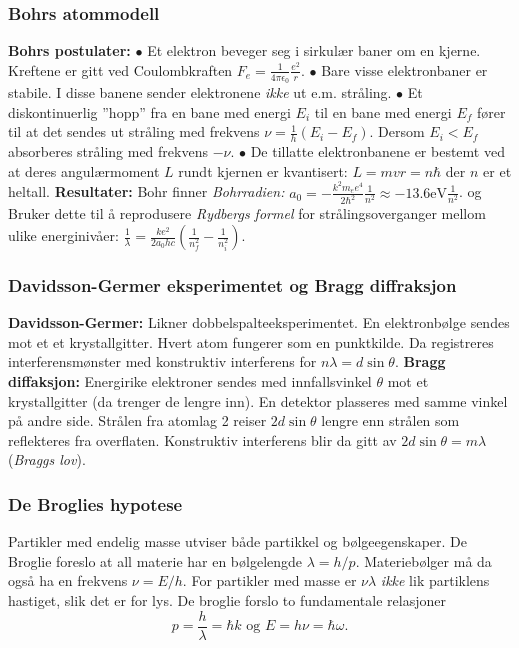 \documentclass[a4paper, norsk, 8pt]{article}
\begin{document}
\begin{multicols*}{3}
\subsubsection*{\scriptsize Bohrs atommodell} 
\textbf{Bohrs postulater:} 
$\bullet$ Et elektron beveger seg i sirkulær baner om en kjerne. Kreftene er gitt ved Coulombkraften $F_e = \frac{1}{4\pi\epsilon_0}\frac{e^2}{r}$.
$\bullet$ Bare visse elektronbaner er stabile. I disse banene sender elektronene \textit{ikke} ut e.m. stråling.
$\bullet$ Et diskontinuerlig ''hopp'' fra en bane med energi $E_i$ til en bane med energi $E_f$ fører til at det sendes ut stråling med frekvens $\nu=\frac{1}{h}(E_i-E_f)$. Dersom $E_i<E_f$ absorberes stråling med frekvens $-\nu$. 
$\bullet$ De tillatte elektronbanene er bestemt ved at deres angulærmoment $L$ rundt kjernen er kvantisert: $L=mvr=n\hbar$ der $n$ er et heltall.
\textbf{Resultater:} Bohr finner \textit{Bohrradien:} $a_0=-\frac{k^2m_ee^4}{2\hbar^2}\frac{1}{n^2}\approx -13.6\mbox{eV}\frac{1}{n^2}$. og Bruker dette til å reprodusere \textit{Rydbergs formel} for strålingsoverganger mellom ulike energinivåer: $\frac{1}{\lambda}=\frac{ke^2}{2a_0hc}\left(\frac{1}{n_f^2}-\frac{1}{n_i^2}\right)$.


\subsubsection*{\scriptsize Davidsson-Germer eksperimentet og Bragg diffraksjon}
\textbf{Davidsson-Germer:} Likner dobbelspalteeksperimentet. En elektronbølge sendes mot et et krystallgitter. Hvert atom fungerer som en punktkilde. Da registreres interferensmønster med konstruktiv interferens for $n\lambda = d \sin \theta$.
\textbf{Bragg diffaksjon:} Energirike elektroner sendes med innfallsvinkel $\theta$ mot et krystallgitter (da trenger de lengre inn). En detektor plasseres med samme vinkel på andre side. Strålen fra atomlag 2 reiser $2d\sin\theta$ lengre enn strålen som reflekteres fra overflaten. Konstruktiv interferens blir da gitt av $2d\sin \theta = m\lambda$ (\textit{Braggs lov}).


\subsubsection*{\scriptsize De Broglies hypotese}
Partikler med endelig masse utviser både partikkel og bølgeegenskaper. De Broglie foreslo at all materie har en bølgelengde $\lambda = h/p$. Materiebølger må da også ha en frekvens $\nu=E/h$. For partikler med masse er $\nu \lambda $ \textit{ikke} lik partiklens hastiget, slik det er for lys. De broglie forslo to fundamentale relasjoner \[p=\frac{h}{\lambda}=\hbar k \mbox{ og } E=h\nu=\hbar \omega.\]



\end{multicols*}
\end{document}
